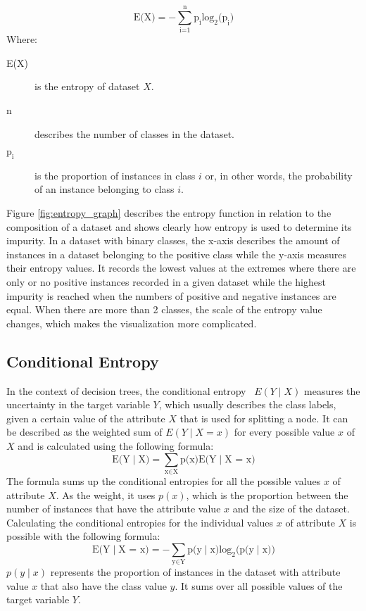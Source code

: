 \[ \text{E(X)} = -\sum_\text{i=1}^\text{n} \text{p}_\text{i} {\text{log}_\text{2} \text{(p}_\text{i})} \]
Where:
\begin{description}
	\item[E(X)] is the entropy of dataset $X$.
	\item[n] describes the number of classes in the dataset.
    \item[$\text{p}_\text{i}$] is the proportion of instances in class $i$ or, in other words, the probability of an instance belonging to class $i$.
\end{description}


Figure \ref{fig:entropy_graph} describes the entropy function in relation to the composition of a dataset and shows clearly how entropy is used to determine its impurity.
In a dataset with binary classes, the x-axis describes the amount of instances in a dataset belonging to the positive class while the y-axis measures their entropy values. It records the lowest values at the extremes where there are only or no positive instances recorded in a given dataset while the highest impurity is reached when the numbers of positive and negative instances are equal.
When there are more than 2 classes, the scale of the entropy value changes, which makes the visualization more complicated.




\subsection{Conditional Entropy} \label{conditional_entropy}
In the context of decision trees, the conditional entropy~\cite{conditional_entropy_wiki} $E(Y\mid X)$ measures the uncertainty in the target variable $Y$, which usually describes the class labels, given a certain value of the attribute $X$ that is used for splitting a node.
It can be described as the weighted sum of $E(Y\mid X = x)$ for every possible value $x$ of $X$ and is calculated using the following formula:
\[\text{E(Y}\mid \text{X}) = \sum_{\text{x} \in \text{X}} \text{p(x)} \text{E(Y}\mid \text{X = x)}\]
The formula sums up the conditional entropies for all the possible values $x$ of attribute $X$. As the weight, it uses $p(x)$, which is the proportion between the number of instances that have the attribute value $x$ and the size of the dataset.
Calculating the conditional entropies for the individual values $x$ of attribute $X$ is possible with the following formula:
\[ \text{E(Y}\mid \text{X = x)} = -\sum_{\text{y} \in \text{Y}} \text{p(y}\mid \text{x)} \text{log}_\text{2} \text{(p(y}\mid \text{x))} \]
$p(y\mid x)$ represents the proportion of instances in the dataset with attribute value $x$ that also have the class value $y$. It sums over all possible values of the target variable $Y$.

